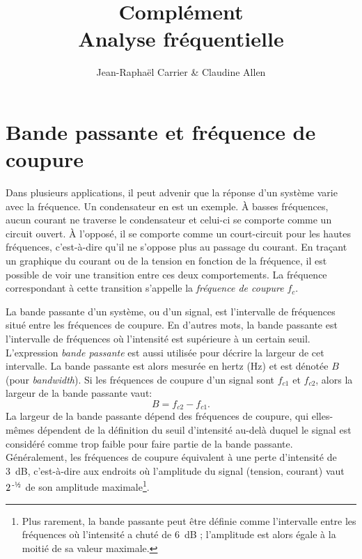 \documentclass[canadien,12pt,oneside,letterpaper]{article}
\begin{document}

\title{\textbf{Complément}\\Analyse fréquentielle}
\author{Jean-Raphaël Carrier \& Claudine Allen}
\date{}
\maketitle


\section{Bande passante et fréquence de coupure}

Dans plusieurs applications, il peut advenir que la réponse d'un système varie avec la fréquence. Un condensateur en est un exemple. À basses fréquences, aucun courant ne traverse le condensateur et celui-ci se comporte comme un circuit ouvert. À l'opposé, il se comporte comme un court-circuit pour les hautes fréquences, c'est-à-dire qu'il ne s'oppose plus au passage du courant. En traçant un graphique du courant ou de la tension en fonction de la fréquence, il est possible de voir une transition entre ces deux comportements. La fréquence correspondant à cette transition s'appelle la \textit{fréquence de coupure} $f_c$.

La bande passante d'un système, ou d'un signal, est l'intervalle de fréquences situé entre les fréquences de coupure. En d'autres mots, la bande passante est l'intervalle de fréquences où l'intensité est supérieure à un certain seuil. L'expression \textit{bande passante} est aussi utilisée pour décrire la largeur de cet intervalle. La bande passante est alors mesurée en hertz (Hz) et est dénotée $B$ (pour \textit{bandwidth}). Si les fréquences de coupure d'un signal sont $f_{c1}$ et $f_{c2}$, alors la largeur de la bande passante vaut:
\begin{equation}
B=f_{c2}-f_{c1}.
\end{equation}
%
La largeur de la bande passante dépend des fréquences de coupure, qui elles-mêmes dépendent de la définition du seuil d'intensité au-delà duquel le signal est considéré comme trop faible pour faire partie de la bande passante. Généralement, les fréquences de coupure équivalent à une perte d'intensité de 3~dB, c'est-à-dire aux endroits où l'amplitude du signal (tension, courant) vaut $2^{\,\text{-\textonehalf}}$ de son amplitude maximale\footnote{Plus rarement, la bande passante peut être définie comme l'intervalle entre les fréquences où l'intensité a chuté de 6~dB ; l'amplitude est alors égale à la moitié de sa valeur maximale.}.
\end{document}
